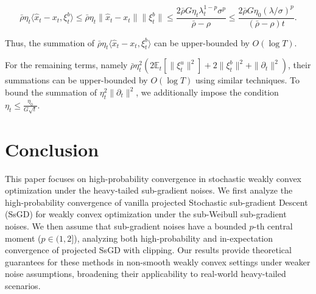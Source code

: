 \documentclass{article}
\begin{document}
\[
\bar{\rho}\eta_t\langle\hat{x}_t - x_t, \xi_t^b\rangle \leq \bar{\rho}\eta_t\|\hat{x}_t - x_t\|\|\xi_t^b\| \leq \frac{2\bar{\rho}G\eta_t\lambda_t^{1-p}\sigma^p}{\bar{\rho} - \rho} \leq \frac{2\bar{\rho}G\eta_0(\lambda/\sigma)^p}{(\bar{\rho} - \rho)t}.
\]  

Thus, the summation of $\bar{\rho}\eta_t\langle\hat{x}_t - x_t, \xi_t^b\rangle$ can be upper-bounded by $O(\log T)$.

For the remaining terms, namely $\bar{\rho}\eta_t^2 \left(2\mathbb{E}_t[\|\xi_t^u\|^2] + 2\|\xi_t^b\|^2 + \|\partial_t\|^2\right)$, their summations can be upper-bounded by $O(\log T)$ using similar techniques. To bound the summation of $\eta_t^2\|\partial_t\|^2$, we additionally impose the condition $\eta_t \leq \frac{\eta_0}{G\sqrt{t}}$.

\section{Conclusion}
This paper focuses on high-probability convergence in stochastic weakly convex optimization under the heavy-tailed sub-gradient noises. We first analyze the high-probability convergence of vanilla projected Stochastic sub-gradient Descent (SsGD) for weakly convex optimization under the sub-Weibull sub-gradient noises. We then assume that sub-gradient noises have a bounded $p$-th central moment ($p\in(1,2]$), analyzing both high-probability and in-expectation convergence of projected SsGD with clipping. Our results provide theoretical guarantees for these methods in non-smooth weakly convex settings under weaker noise assumptions, broadening their applicability to real-world heavy-tailed scenarios.



 



\newpage
\appendix
\end{document}
